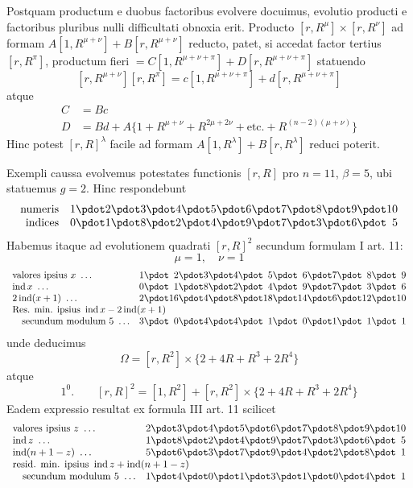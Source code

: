 Postquam productum e duobus factoribus evolvere docuimus, evolutio producti e factoribus pluribus nulli difficultati obnoxia erit. Producto $[r,R^\mu]\times[r,R^\nu]$ ad formam $A[1,R^{\mu+\nu}]+B[r,R^{\mu+\nu}]$ reducto, patet, si accedat factor tertius $[r,R^\pi]$, productum fieri $=C[1,R^{\mu+\nu+\pi}]+D[r,R^{\mu+\nu+\pi}]$ statuendo
\[
[r,R^{\mu+\nu}][r,R^\pi]=c[1,R^{\mu+\nu+\pi}]+d[r,R^{\mu+\nu+\pi}]
\]
atque
\[
\begin{aligned}
C&=Bc\\
D&=Bd+A\{1+R^{\mu+\nu}+R^{2\mu+2\nu}+\text{etc.}+R^{(n-2)(\mu+\nu)}\}
\end{aligned}
\]
Hinc potest $[r,R]^\lambda$ facile ad formam $A[1,R^\lambda]+B[r,R^\lambda]$ reduci poterit.

Exempli caussa evolvemus potestates functionis $[r,R]$ pro $n=11$, $\beta=5$, ubi statuemus $g=2$. Hinc respondebunt
\[
\begin{array}{r@{\quad}r@{\pdot}r@{\pdot}r@{\pdot}r@{\pdot}r@{\pdot}r@{\pdot}r@{\pdot}r@{\pdot}r@{\pdot}r}
\text{numeris}&1&2&3&4&5&6&7&8&9&10\\
\text{indices}&0&1&8&2&4&9&7&3&6&5
\end{array}
\]
Habemus itaque ad evolutionem quadrati $[r,R]^2$ secundum formulam I art. 11:
\[
\mu=1,\quad\nu=1
\]
\[
\begin{array}{l@{\quad}r@{\pdot}r@{\pdot}r@{\pdot}r@{\pdot}r@{\pdot}r@{\pdot}r@{\pdot}r@{\pdot}r}
\text{valores ipsius }x\ \ldots&1&2&3&4&5&6&7&8&9\\
\operatorname{ind}x\ \ldots&0&1&8&2&4&9&7&3&6\\
2\operatorname{ind}(x+1)\ \ldots&2&16&4&8&18&14&6&12&10\\
\multicolumn{10}{l}{\text{Res. min. ipsius }\operatorname{ind}x-2\operatorname{ind}(x+1)}\\
\quad\text{secundum modulum }5\ \ldots&3&0&4&4&1&0&1&1&1
\end{array}
\]
unde deducimus
\[
\Omega=[r,R^2]\times\{2+4R+R^3+2R^4\}
\]
atque
\[
1^0.\qquad[r,R]^2=[1,R^2]+[r,R^2]\times\{2+4R+R^3+2R^4\}
\]
Eadem expressio resultat ex formula III art. 11 scilicet
\[
\begin{array}{l@{\quad}r@{\pdot}r@{\pdot}r@{\pdot}r@{\pdot}r@{\pdot}r@{\pdot}r@{\pdot}r@{\pdot}r}
\text{valores ipsius }z\ \ldots&2&3&4&5&6&7&8&9&10\\
\operatorname{ind}z\ \ldots&1&8&2&4&9&7&3&6&5\\
\operatorname{ind}(n+1-z)\ \ldots&5&6&3&7&9&4&2&8&1\\
\multicolumn{10}{l}{\text{resid. min. ipsius }\operatorname{ind}z+\operatorname{ind}(n+1-z)}\\
\quad\text{secundum modulum }5\ \ldots&1&4&0&1&3&1&0&4&1
\end{array}
\]

